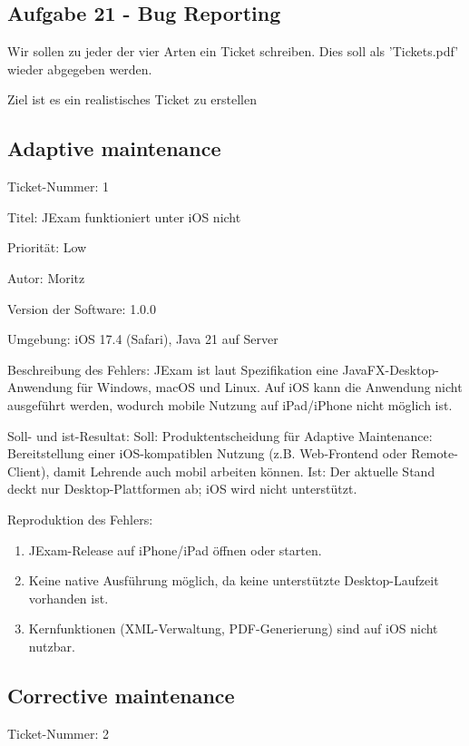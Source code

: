 \documentclass[a4paper]{article}
\begin{document}
\subsection{Aufgabe 21 - Bug Reporting}

Wir sollen zu jeder der vier Arten ein Ticket schreiben. Dies soll als 'Tickets.pdf' wieder abgegeben werden.

Ziel ist es ein realistisches Ticket zu erstellen

\subsection*{Adaptive maintenance}

Ticket-Nummer: 1

Titel: JExam funktioniert unter iOS nicht

Priorität: Low

Autor: Moritz

Version der Software: 1.0.0

Umgebung: iOS 17.4 (Safari), Java 21 auf Server

Beschreibung des Fehlers: JExam ist laut Spezifikation eine JavaFX-Desktop-Anwendung für Windows, macOS und Linux. Auf iOS kann die Anwendung nicht ausgeführt werden, wodurch mobile Nutzung auf iPad/iPhone nicht möglich ist.

Soll- und ist-Resultat: Soll: Produktentscheidung für Adaptive Maintenance: Bereitstellung einer iOS-kompatiblen Nutzung (z.B. Web-Frontend oder Remote-Client), damit Lehrende auch mobil arbeiten können. Ist: Der aktuelle Stand deckt nur Desktop-Plattformen ab; iOS wird nicht unterstützt.

Reproduktion des Fehlers: 

\begin{enumerate}
    \item JExam-Release auf iPhone/iPad öffnen oder starten.
    \item Keine native Ausführung möglich, da keine unterstützte Desktop-Laufzeit vorhanden ist.
    \item Kernfunktionen (XML-Verwaltung, PDF-Generierung) sind auf iOS nicht nutzbar.
\end{enumerate}

\subsection*{Corrective maintenance}

Ticket-Nummer: 2
\end{document}

